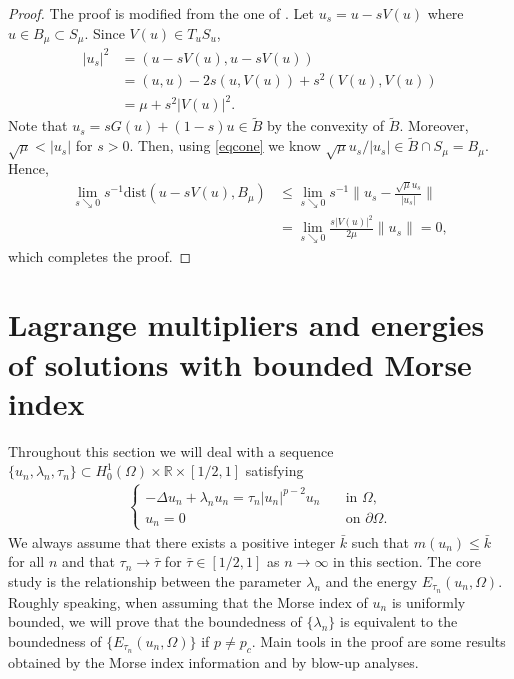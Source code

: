 \documentclass[10pt,a4paper]{article}
\theoremstyle{definition} \theoremstyle{remark}
\numberwithin{equation}{section}
\newcommand{\R}{\mathbb{R}}
\newcommand{\la}{\lambda}
\begin{document}
\begin{proof}
	The proof is modified from the one of \cite[Lemma 4.7]{JS}.
	Let $u_s = u - sV(u)$ where $u \in B_\mu \subset S_\mu$. Since $V(u) \in T_uS_u$,
	\begin{align*}
		|u_s|^2 & = (u-sV(u),u-sV(u)) \\
		& = (u,u) - 2s(u,V(u)) + s^2(V(u),V(u)) \\
		& = \mu + s^2|V(u)|^2.
	\end{align*}
	Note that $u_s = sG(u) + (1-s)u \in \tilde B$ by the convexity of $\tilde B$. Moreover, $\sqrt{\mu} < |u_s|$ for $s > 0$. Then, using \eqref{eqcone} we know $\sqrt \mu u_s/|u_s| \in \tilde B \cap S_\mu = B_\mu$. Hence,
	\begin{align*}
		\lim_{s \searrow 0}s^{-1}\text{dist}(u - sV(u),B_\mu) & \leq \lim_{s \searrow 0}s^{-1}\bigl\|u_s -  \frac{\sqrt\mu u_s}{|u_s|}\bigr\| \\
		& = \lim_{s \searrow 0}\frac {s|V(u)|^2}{2\mu}\|u_s\| = 0,
	\end{align*}
	which completes the proof.
\end{proof}

\section{Lagrange multipliers and energies of solutions with bounded Morse index} \label{secLagrange multiplier}

Throughout this section we will deal with a sequence $\{u_n,\la_n,\tau_n\} \subset H_0^1(\Omega) \times \R \times [1/2,1]$ satisfying
\begin{align} \label{equn}
	\begin{cases}
		-\Delta u_n + \la_n u_n = \tau_n|u_n|^{p-2}u_n & \quad \text{in } \Omega, \\
		u_n = 0 & \quad \text{on } \partial \Omega.
	\end{cases}	
\end{align}
We always assume that there exists a positive integer $\bar k$ such that $m(u_n) \le \bar k$ for all $n$ and that $\tau_n \to \bar \tau$ for $\bar\tau \in [1/2,1]$ as $n \to \infty$ in this section. The core study is the relationship between the parameter $\la_n$ and the energy $E_{\tau_n}(u_n,\Omega)$. Roughly speaking, when assuming that the Morse index of $u_n$ is uniformly bounded, we will prove that the boundedness of $\{\la_n\}$ is equivalent to the boundedness of $\{E_{\tau_n}(u_n,\Omega)\}$ if $p \neq p_c$. Main tools in the proof are some results obtained by the Morse index information and by blow-up analyses.
\end{document}
